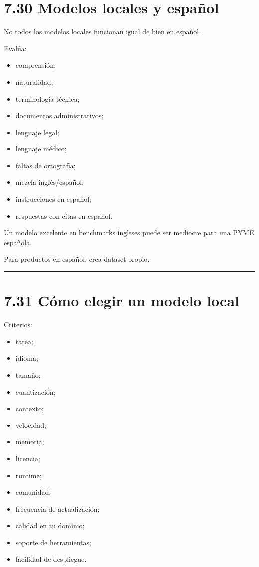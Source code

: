 \section{7.30 Modelos locales y
español}\label{modelos-locales-y-espauxf1ol}

No todos los modelos locales funcionan igual de bien en español.

Evalúa:

\begin{itemize}
\tightlist
\item
  comprensión;
\item
  naturalidad;
\item
  terminología técnica;
\item
  documentos administrativos;
\item
  lenguaje legal;
\item
  lenguaje médico;
\item
  faltas de ortografía;
\item
  mezcla inglés/español;
\item
  instrucciones en español;
\item
  respuestas con citas en español.
\end{itemize}

Un modelo excelente en benchmarks ingleses puede ser mediocre para una
PYME española.

Para productos en español, crea dataset propio.

\begin{center}\rule{0.5\linewidth}{0.5pt}\end{center}

\section{7.31 Cómo elegir un modelo
local}\label{cuxf3mo-elegir-un-modelo-local}

Criterios:

\begin{itemize}
\tightlist
\item
  tarea;
\item
  idioma;
\item
  tamaño;
\item
  cuantización;
\item
  contexto;
\item
  velocidad;
\item
  memoria;
\item
  licencia;
\item
  runtime;
\item
  comunidad;
\item
  frecuencia de actualización;
\item
  calidad en tu dominio;
\item
  soporte de herramientas;
\item
  facilidad de despliegue.
\end{itemize}

